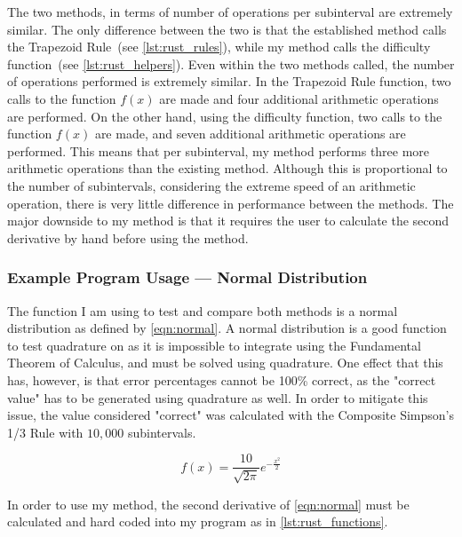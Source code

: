 \documentclass{paper}
\begin{document}








The two methods, in terms of number of operations per subinterval are extremely similar.
The only difference between the two is that the established method calls the Trapezoid Rule~(see \cref{lst:rust_rules}), while my method calls the difficulty function~(see \cref{lst:rust_helpers}).
Even within the two methods called, the number of operations performed is extremely similar.
In the Trapezoid Rule function, two calls to the function \(f(x)\) are made and four additional arithmetic operations are performed.
On the other hand, using the difficulty function, two calls to the function \(f(x)\) are made, and seven additional arithmetic operations are performed.
This means that per subinterval, my method performs three more arithmetic operations than the existing method.
Although this is proportional to the number of subintervals, considering the extreme speed of an arithmetic operation, there is very little difference in performance between the methods.
The major downside to my method is that it requires the user to calculate the second derivative by hand before using the method.

\subsubsection{Example Program Usage --- Normal Distribution}
\label{sec:normal}
The function I am using to test and compare both methods is a normal distribution as defined by \cref{eqn:normal}.
A normal distribution is a good function to test quadrature on as it is impossible to integrate using the Fundamental Theorem of Calculus, and must be solved using quadrature.
One effect that this has, however, is that error percentages cannot be 100\% correct, as the "correct value" has to be generated using quadrature as well.
In order to mitigate this issue, the value considered "correct" was calculated with the Composite Simpson's 1/3 Rule with \(10,000\) subintervals.

\begin{equation}
    \label{eqn:normal}
    f(x) = \frac{10}{\sqrt{2\pi}}e^{-\frac{x^2}{2}}
\end{equation}

In order to use my method, the second derivative of \cref{eqn:normal} must be calculated and hard coded into my program as in \cref{lst:rust_functions}.
\end{document}
